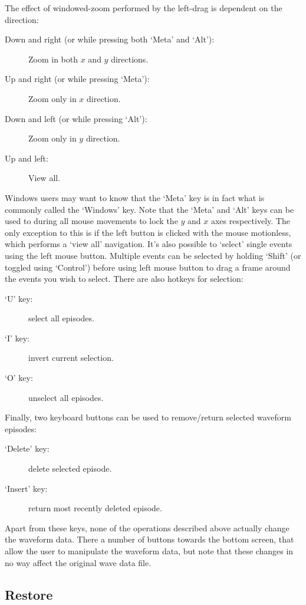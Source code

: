 \documentclass{article}
\begin{document}
The effect of windowed-zoom performed by the left-drag is dependent on the direction:

\begin{description}
	\item[Down and right (or while pressing both `Meta' and `Alt'):] Zoom in both $x$ and $y$ directions.
	\item[Up and right (or while pressing `Meta'):] Zoom only in $x$ direction.
	\item[Down and left (or while pressing `Alt'):] Zoom only in $y$ direction.
	\item[Up and left:] View all.
\end{description}

Windows users may want to know that the `Meta' key is in fact what is commonly called the `Windows' key. Note that the
`Meta' and `Alt' keys can be used to during all mouse movements to lock the $y$ and $x$ axes respectively.  The only
exception to this is if the left button is clicked with the mouse motionless, which performs a `view all' navigation.
It's also possible to `select' single events using the left mouse button. Multiple events can be selected by holding
`Shift' (or toggled using `Control') before using left mouse button to drag a frame around the events you wish to
select. There are also hotkeys for selection:

\begin{description}
	\item[`U' key:] select all episodes.
	\item[`I' key:] invert current selection.
	\item[`O' key:] unselect all episodes.
\end{description}

Finally, two keyboard buttons can be used to remove/return selected waveform episodes:

\begin{description}
	\item[`Delete' key:] delete selected episode.
	\item[`Insert' key:] return most recently deleted episode.
\end{description}

Apart from these keys, none of the operations described above actually change the waveform data. There a number of
buttons towards the bottom screen, that allow the user to manipulate the waveform data, but note that these changes in
no way affect the original wave data file.

\subsection{Restore}
\end{document}
